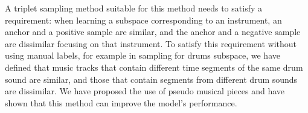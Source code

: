 A triplet sampling method suitable for this method needs to satisfy a requirement: when learning a subspace corresponding to an instrument, an anchor and a positive sample are similar, and the anchor and a negative sample are dissimilar focusing on that instrument. To satisfy this requirement without using manual labels, for example in sampling for drums subspace, we have defined that music tracks that contain different time segments of the same drum sound are similar, and those that contain segments from different drum sounds are dissimilar. We have proposed the use of pseudo musical pieces and have shown that this method can improve the model’s performance.